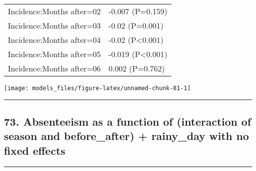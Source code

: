 \documentclass[]{article}
\begin{document}
\begin{longtable}[t]{ll}
\hspace{1em}Incidence:Months after=02 & -0.007 (P=0.159)\\
\hspace{1em}Incidence:Months after=03 & -0.02 (P=0.001)\\
\hspace{1em}Incidence:Months after=04 & -0.02 (P<0.001)\\
\hspace{1em}Incidence:Months after=05 & -0.019 (P<0.001)\\
\hspace{1em}Incidence:Months after=06 & 0.002 (P=0.762)\\*
\end{longtable}

\begin{center}\texttt{[image: models\_files/figure-latex/unnamed-chunk-81-1]} \end{center}

\newpage

\begin{center}\rule{0.5\linewidth}{\linethickness}\end{center}

\subsection{73. Absenteeism as a function of (interaction of season and
before\_after) + rainy\_day with no fixed
effects}\label{absenteeism-as-a-function-of-interaction-of-season-and-before_after-rainy_day-with-no-fixed-effects}

\begin{center}\rule{0.5\linewidth}{\linethickness}\end{center}
\end{document}
